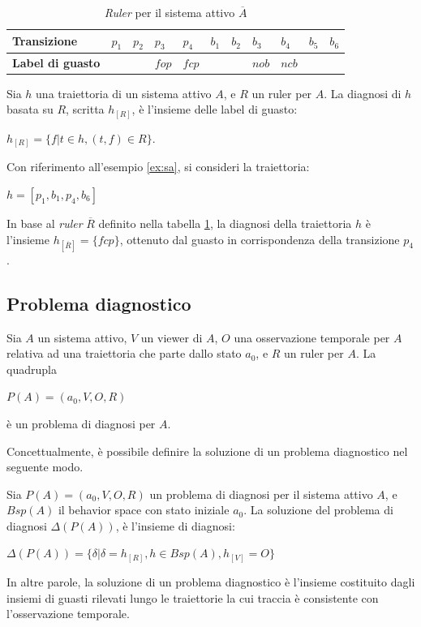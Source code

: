 \begin{table}[htbp] 
\begin{tabularx}{\textwidth}{l X X X X X X X X X X}
\hline
\textbf{Transizione} & $p_1$ & $p_2$ & $p_3$ & $p_4$ & $b_1$ & $b_2$ & $b_3$ & $b_4$ & $b_5$ & $b_6$\\
\hline
\textbf{Label di guasto} &  &  & $\mathit{fop}$ & $\mathit{fcp}$ &  &  & $\mathit{nob}$ & $\mathit{ncb}$ &  & \\
\hline
\end{tabularx}
\caption{\emph{Ruler} per il sistema attivo $\overline{A}$}
\label{tab:ruler}
\end{table}

\begin{defn}
Sia $h$ una traiettoria di un sistema attivo $A$, e $R$ un ruler per $A$. La diagnosi di $h$ basata su $R$, scritta $h_{[R]}$, è l'insieme delle label di guasto:
\begin{center}
	$h_{[R]} = \{ f | t \in h, (t,f) \in R \}$.
\end{center}
\end{defn}

\begin{ex}
Con riferimento all'esempio \ref{ex:sa}, si consideri la traiettoria:
\begin{center}
$h = [p_1,b_1,p_4,b_6]$
\end{center} 
In base al \emph{ruler} $\overline{R}$ definito nella tabella \ref{tab:ruler}, la diagnosi della traiettoria $h$ è l'insieme $h_{[\overline{R}]} = \{\mathit{fcp}\}$, ottenuto dal guasto in corrispondenza della transizione $p_4$.
\end{ex}

\subsection{Problema diagnostico}
\begin{defn}
Sia $A$ un sistema attivo, $V$ un viewer di $A$, $O$ una osservazione temporale per $A$ relativa ad una traiettoria che parte dallo stato $a_0$, e $R$ un ruler per $A$. La quadrupla
\begin{center}
	$P(A) = (a_0,V,O,R)$
\end{center}
è un problema di diagnosi per $A$.
\end{defn}
Concettualmente, è possibile definire la soluzione di un problema diagnostico nel seguente modo.
\begin{defn}
Sia $P(A) = (a_0,V,O,R)$ un problema di diagnosi per il sistema attivo $A$, e $Bsp(A)$ il behavior space con stato iniziale $a_0$. La soluzione del problema di diagnosi $\Delta(P(A))$, è l'insieme di diagnosi:
\begin{center}
	$\Delta(P(A)) = \{ \delta | \delta = h_{[R]}, h \in Bsp(A), h_{[V]} = O\}$
\end{center}
\end{defn}
In altre parole, la soluzione di un problema diagnostico è l'insieme costituito dagli insiemi di guasti rilevati lungo le traiettorie la cui traccia è consistente con l'osservazione temporale.

